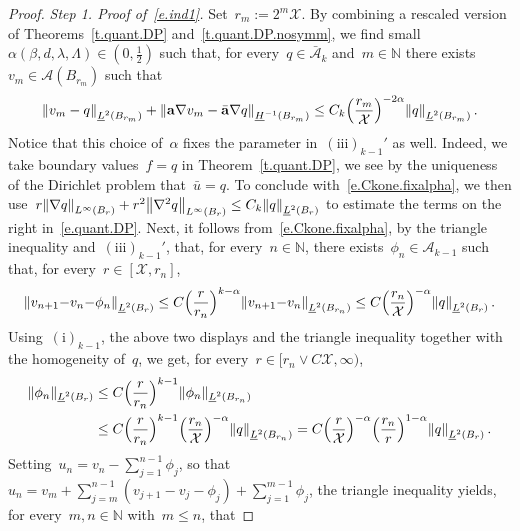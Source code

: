 \documentclass[11pt,twoside]{article} %
\numberwithin{equation}{section}
\theoremstyle{definition}
\let\originalleft\left
\let\originalright\right
\renewcommand{\left}{\mathopen{}\mathclose\bgroup\originalleft}
\renewcommand{\right}{\aftergroup\egroup\originalright}
\newcommand*{\N}{\ensuremath{\mathbb{N}}}
\renewcommand{\a}{\mathbf{a}}
\newcommand{\ahom}{\bar{\a}}
\newcommand{\X}{\mathcal{X}}
\newcommand{\A}{\mathcal{A}}
\newcommand{\Ahom}{\bar{\A}}
\begin{document}
\begin{proof}
\smallskip

\emph{Step 1. Proof of~\eqref{e.ind1}.}  Set~$r_m := 2^m \X$. By combining a rescaled version of Theorems~\ref{t.quant.DP} and~\ref{t.quant.DP.nosymm},  we find small~$\alpha(\beta,d,\lambda,\Lambda) \in (0,\frac12)$ such that, for every~$q \in \Ahom_k$ and~$m \in \N$ there exists~$v_m \in \A(B_{r_m})$ such that
\begin{equation} \label{e.Ckone.fixalpha}
\left\| v_{m} - q \right\|_{\underline{L}^2(B_{r_m})} 
+ 
\left\|  \a \nabla v_m - \ahom \nabla q \right\|_{\underline{H}^{-1}(B_{r_m})} 
\leq 
C_k \Bigl( \frac{r_m}{\X} \Bigr)^{-2\alpha} \left\| q \right\|_{\underline{L}^2(B_{r_m})}
\, .
\end{equation}
Notice that this choice of~$\alpha$ fixes the parameter in~$\mathrm{(iii)}_{k-1}'$ as well. 
Indeed, we take boundary values~$f = q$ in Theorem~\ref{t.quant.DP}, we see by the uniqueness of the Dirichlet problem that~$\bar u = q$. To conclude with~\eqref{e.Ckone.fixalpha}, we then use~$r \left\| \nabla q \right\|_{L^\infty(B_r)} + r^2 \left\| \nabla^2 q \right\|_{L^\infty(B_r)} \leq C_k \left\| q \right\|_{\underline{L}^2(B_r)}$ to estimate the terms on the right in~\eqref{e.quant.DP}. 
Next, it follows from~\eqref{e.Ckone.fixalpha}, by the triangle inequality and~$\mathrm{(iii)}_{k-1}'$, that, for every~$n \in\N$, there exists~$\phi_{n} \in \A_{k-1}$ such that, for every~$r \in  [\X , r_n]$,   
\begin{align*}  
\left\| v_{n+1} {-} v_{n} {-} \phi_{n} \right\|_{\underline{L}^2(B_r)}   
\leq 
C
\Bigl(\frac{r}{r_n}\Bigr)^{k-\alpha}  \left\| v_{n+1} {-} v_{n} \right\|_{\underline{L}^2(B_{r_n})} 
\leq 
C \Bigl( \frac{r_n}{\X} \Bigr)^{-\alpha}  \left\| q \right\|_{\underline{L}^2(B_r)}
\,.
\end{align*}
Using~$\mathrm{(i)}_{k-1}$, the above two displays and the triangle inequality together with the homogeneity of~$q$, we get, for every~$r \in [r_n \vee C\X,\infty)$,  
\begin{align*}  
\| \phi_{n} \|_{\underline{L}^2(B_r)} 
& 
\leq 
C\Bigl( \frac{r}{r_n} \Bigr)^{k-1} \| \phi_{n}  \|_{\underline{L}^2(B_{r_n})} 
\\ &
\leq 
C \Bigl( \frac{r}{r_n} \Bigr)^{k-1}  \Bigl( \frac{r_n}{\X} \Bigr)^{-\alpha}  \left\| q \right\|_{\underline{L}^2(B_{r_n})}
=
C \Bigl( \frac{r}{\X} \Bigr)^{-\alpha}  \Bigl( \frac{r_n}{r} \Bigr)^{1-\alpha}  \left\| q \right\|_{\underline{L}^2(B_{r})}
\,.
\end{align*}
Setting~$u_n = v_n - \sum_{j=1}^{n-1} \phi_j$, so that~$u_n = v_m +  \sum_{j=m}^{n-1}(v_{j+1} - v_j -\phi_j) + \sum_{j=1}^{m-1} \phi_j$,  the triangle inequality yields, for every~$m,n \in \N$ with~$m \leq n$, that

\end{proof}
\end{document}
